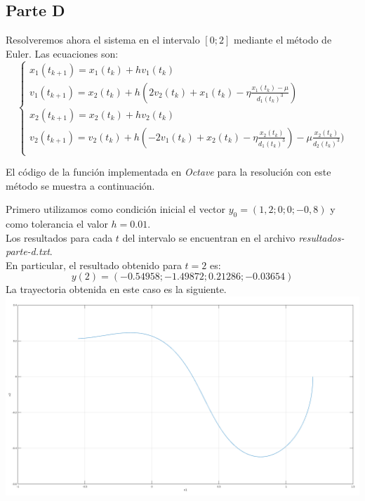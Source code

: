 \documentclass[titlepage,a4paper]{article}
\begin{document}
	\subsection{Parte D}\label{sec:parteD}
	Resolveremos ahora el sistema en el intervalo $[0; 2]$ mediante el método de Euler. Las ecuaciones son:
	\begin{equation}
		\begin{cases}
			x_1 (t_{k+1}) = x_1 (t_{k}) + hv_1 (t_{k})\\
			v_1 (t_{k+1}) = x_2 (t_{k}) + h(2v_2 (t_{k}) + x_1 (t_{k}) - \eta\frac{x_1 (t_{k}) - \mu}{d_1 (t_{k})^{3}})\\
			x_2 (t_{k+1}) = x_2 (t_{k}) + hv_2 (t_{k})\\
			v_2 (t_{k+1}) = v_2 (t_{k}) + h(-2v_1 (t_{k}) + x_2 (t_{k}) - \eta\frac{x_2 (t_{k})}{d_1 (t_{k})^{3}}) - \mu\frac{x_2 (t_{k})}{d_2 (t_{k})^{3}})\\
		\end{cases}
	\end{equation}

	El código de la función implementada en \emph{Octave} para la resolución con este método se muestra a continuación.
	
	Primero utilizamos como condición inicial el vector $ y_0 = (1,2; 0; 0; -0,8) $ y como tolerancia el valor $ h = 0.01 $.\\
	Los resultados para cada $t$ del intervalo se encuentran en el archivo \emph{resultados-parte-d.txt}.\\
	En particular, el resultado obtenido para $t=2$ es:
	\begin{equation}
		y(2) = (-0.54958; -1.49872; 0.21286; -0.03654)
	\end{equation}
	La trayectoria obtenida en este caso es la siguiente.\\
	\includegraphics[width=\textwidth]{parted.png}
\end{document}
